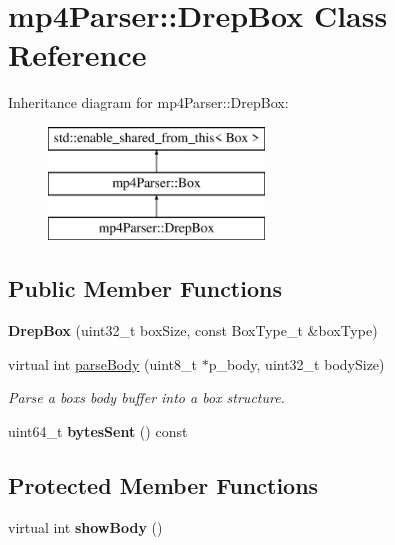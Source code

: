 \hypertarget{classmp4_parser_1_1_drep_box}{}\section{mp4\+Parser\+::Drep\+Box Class Reference}
\label{classmp4_parser_1_1_drep_box}
Inheritance diagram for mp4\+Parser\+::Drep\+Box\+:\begin{figure}[H]
\begin{center}
\leavevmode
\includegraphics[height=3.000000cm]{classmp4_parser_1_1_drep_box}
\end{center}
\end{figure}
\subsection*{Public Member Functions}
\begin{DoxyCompactItemize}
\item 
\mbox{\label{classmp4_parser_1_1_drep_box_a8d65f77965970e686ca2b97264ce2798}} 
{\bfseries Drep\+Box} (uint32\+\_\+t box\+Size, const Box\+Type\+\_\+t \&box\+Type)
\item 
virtual int \mbox{\hyperlink{classmp4_parser_1_1_drep_box_a5285192d3fbb13b91493942f05c04ca8}{parse\+Body}} (uint8\+\_\+t $\ast$p\+\_\+body, uint32\+\_\+t body\+Size)
\begin{DoxyCompactList}\small\item\em Parse a box\textquotesingle{}s body buffer into a box structure. \end{DoxyCompactList}\item 
\mbox{\label{classmp4_parser_1_1_drep_box_a89a04251371e3928cd8330463226b2a4}} 
uint64\+\_\+t {\bfseries bytes\+Sent} () const
\end{DoxyCompactItemize}
\subsection*{Protected Member Functions}
\begin{DoxyCompactItemize}
\item 
\mbox{\label{classmp4_parser_1_1_drep_box_a08710b5d8565986eec9a8362f07ceec5}} 
virtual int {\bfseries show\+Body} ()
\end{DoxyCompactItemize}
